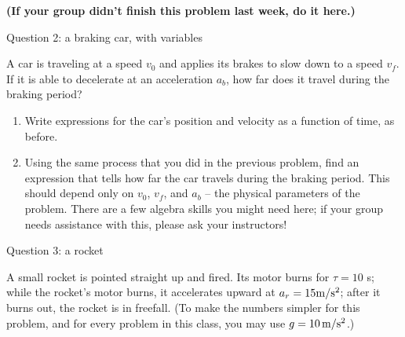 \documentclass[12pt]{article}
\begin{document}
\vspace*{\fill}
\begin{center}
\bf (If your group didn't finish this problem last week, do it here.) 
\end{center}

\newpage

\centerline{\Large Question 2: a braking car, with variables}

A car is traveling at a speed $v_0$ and applies its brakes to slow down to a speed $v_f$. If it is able to decelerate at an acceleration $a_b$, how far does it travel during the braking period?

\begin{enumerate}
\item Write expressions for the car's position and velocity as a function of time, as before.

\vspace{1in}


\item Using the same process that you did in the previous problem, find an expression that tells how far the car travels during the braking period. This should depend only on $v_0$, $v_f$, and $a_b$ -- the physical parameters of the problem. There are a few algebra skills you might need here; if your group needs assistance with this, please ask your instructors!

\vspace{3in}

\end{enumerate}
\newpage

\centerline{\Large Question 3: a rocket}

A small rocket is pointed straight up and fired. Its motor burns for $\tau=10$ s; while the rocket's motor burns, it
accelerates upward at $a_r=15 \rm m/\rm s^2$; after it burns out, the rocket is in freefall. (To make the numbers simpler for 
this problem, and for every problem in this class, you may use $g=10\, \rm m/\rm s^2$.)
\end{document}
